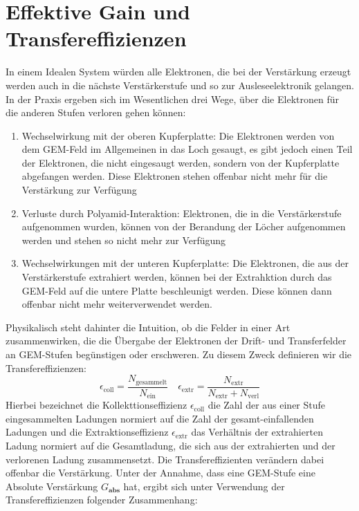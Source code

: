 \section{Effektive Gain und Transfereffizienzen}
In einem Idealen System würden alle Elektronen, die bei der Verstärkung erzeugt werden auch in die nächste Verstärkerstufe und so zur Ausleseelektronik gelangen. In der Praxis ergeben sich im Wesentlichen drei Wege, über die Elektronen für die anderen Stufen verloren gehen können:
\begin{enumerate}
	\item Wechselwirkung mit der oberen Kupferplatte: Die Elektronen werden von dem GEM-Feld im Allgemeinen in das Loch gesaugt, es gibt jedoch einen Teil der Elektronen, die nicht eingesaugt werden, sondern von der Kupferplatte abgefangen werden. Diese Elektronen stehen offenbar nicht mehr für die Verstärkung zur Verfügung
	\item Verluste durch Polyamid-Interaktion: Elektronen, die in die Verstärkerstufe aufgenommen wurden, können von der Berandung der Löcher aufgenommen werden und stehen so nicht mehr zur Verfügung
	\item Wechselwirkungen mit der unteren Kupferplatte: Die Elektronen, die aus der Verstärkerstufe extrahiert werden, können bei der Extrahktion durch das GEM-Feld auf die untere Platte beschleunigt werden. Diese können dann offenbar nicht mehr weiterverwendet werden. 
\end{enumerate}
Physikalisch steht dahinter die Intuition, ob die Felder in einer Art zusammenwirken, die die Übergabe der Elektronen der Drift- und Transferfelder an GEM-Stufen begünstigen oder erschweren. Zu diesem Zweck definieren wir die Transfereffizienzen:
\begin{equation*}
	\epsilon_{\text{coll}}=\frac{N_{\text{gesammelt}}}{N_{\text{ein}}} \quad \epsilon_{\text{extr}}=\frac{N_{\text{extr}}}{N_{\text{extr}}+N_{\text{verl}}}
\end{equation*}
Hierbei bezeichnet die Kollekttionseffizienz $\epsilon_{\text{coll}}$ die Zahl der aus einer Stufe eingesammelten Ladungen normiert auf die Zahl der gesamt-einfallenden Ladungen und die Extraktionseffizienz $\epsilon_{\text{extr}}$ das Verhältnis der extrahierten Ladung normiert auf die Gesamtladung, die sich aus der extrahierten und der verlorenen Ladung zusammensetzt. Die Transfereffizienten verändern dabei offenbar die Verstärkung. Unter der Annahme, dass eine GEM-Stufe eine Absolute Verstärkung $G_{\textbf{abs}}$ hat, ergibt sich unter Verwendung der Transfereffizienzen folgender Zusammenhang:
